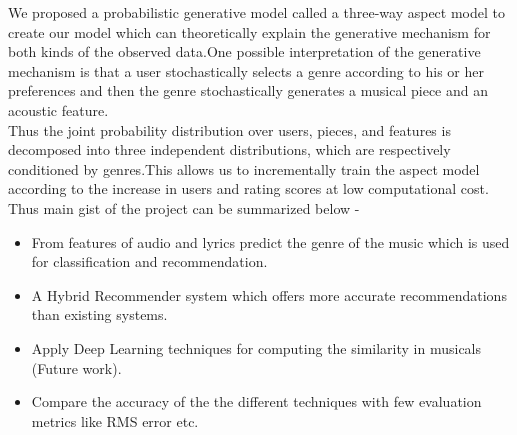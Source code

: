 \documentclass{sig-alternate-05-2015}
\begin{document}
We proposed a probabilistic generative model called a three-way aspect model to create our model which can theoretically explain the generative mechanism for both kinds of the observed data.One possible interpretation of the generative mechanism is that a user stochastically selects a genre according to his or her preferences and then the genre stochastically generates a musical piece and an acoustic feature.\\

Thus the joint probability distribution over users, pieces, and features is decomposed into three independent distributions, which are respectively conditioned by genres.This allows us to incrementally train the aspect model according to the increase in users and rating scores at low computational cost.\\

Thus main gist of the project can be summarized below -\\

\begin{itemize}
    \item From features of audio and lyrics predict the genre of the music which is used for classification and recommendation.
    \item A Hybrid Recommender system which offers more accurate recommendations than existing systems.
    \item Apply Deep Learning techniques for computing the similarity in musicals (Future work).
    \item Compare the accuracy of the the different techniques with few evaluation metrics like RMS error etc.
\end{itemize}
\end{document}
